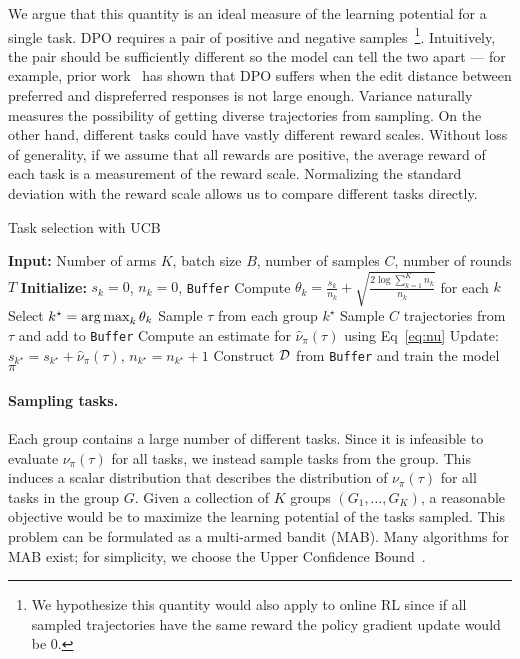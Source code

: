 We argue that this quantity is an ideal measure of the learning potential for a single task. DPO requires a pair of positive and negative samples~\footnote{We hypothesize this quantity would also apply to online RL since if all sampled trajectories have the same reward the policy gradient update would be $0$.}. Intuitively, the pair should be sufficiently different so the model can tell the two apart --- for example, prior work~\citep{pal2024smaugfixingfailuremodes} has shown that DPO suffers when the edit distance between preferred and dispreferred responses is not large enough. Variance naturally measures the possibility of getting diverse trajectories from sampling. On the other hand, different tasks could have vastly different reward scales. Without loss of generality, if we assume that all rewards are positive, the average reward of each task is a measurement of the reward scale. Normalizing the standard deviation with the reward scale allows us to compare different tasks directly.

\begin{algorithm}[t]
\label{alg:sampling}
\caption{Task selection with UCB}
\begin{algorithmic}[1]
\STATE \textbf{Input:} Number of arms $K$, batch size $B$, number of samples $C$, number of rounds $T$
\STATE \textbf{Initialize:} $s_k=0$, $n_k=0$, \texttt{Buffer}
    \STATE Compute $\theta_k = \tfrac{s_k}{n_k} + \sqrt{\tfrac{2 \log \sum_{k=1}^K n_k}{n_k}}$ for each $k$
    \STATE Select $k^\star = \operatorname*{arg\,max}_k \theta_k$
    \STATE Sample $\tau$ from each group $k^\star$
    \STATE Sample $C$ trajectories from $\tau$ and add to \texttt{Buffer}
    \STATE Compute an estimate for $\hat{\nu}_\pi(\tau)$ using Eq~\ref{eq:nu}
    \STATE Update: $s_{k^\star} = s_{k^\star}  + \hat{\nu}_\pi(\tau), \,n_{k^\star} = n_{k^\star}  + 1$
\ENDFOR
\STATE Construct ${\mathcal{D}}$ from \texttt{Buffer} and train the model $\pi$
\end{algorithmic}
\end{algorithm}

\paragraph{Sampling tasks.}Each group contains a large number of different tasks. 
Since it is infeasible to evaluate $\nu_\pi(\tau)$ for all tasks, we instead sample tasks from the group. 
This induces a scalar distribution that describes the distribution of $\nu_\pi(\tau)$ for all tasks in the group $G$.
Given a collection of $K$ groups $(G_1, \dots, G_K)$, a reasonable objective would be to maximize the learning potential of the tasks sampled. This problem can be formulated as a multi-armed bandit (MAB). Many algorithms for MAB exist; for simplicity, we choose the Upper Confidence Bound~\citep[UCB]{auer2000using}.

